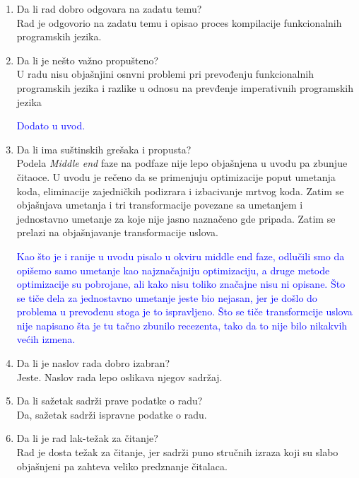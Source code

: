 \documentclass[a4paper]{report}
\newcommand{\odgovor}[1]{\textcolor{blue}{#1}}
\begin{document}
	\begin{enumerate}
		
		\item Da li rad dobro odgovara na zadatu temu?\\
		Rad je odgovorio na zadatu temu i opisao proces kompilacije funkcionalnih programskih jezika.
		
		\item Da li je nešto važno propušteno?\\
		U radu nisu objašnjini osnvni problemi pri prevođenju funkcionalnih programskih jezika i razlike u odnosu na prevđenje imperativnih programskih jezika
		
		\odgovor{Dodato u uvod.}
		
		\item Da li ima suštinskih grešaka i propusta?\\
		Podela \emph{Middle end} faze na podfaze nije lepo objašnjena u uvodu pa zbunjue čitaoce. U uvodu je rečeno da se primenjuju  optimizacije poput umetanja koda, eliminacije zajedničkih podizrara i izbacivanje mrtvog koda. Zatim se objašnjava umetanja i tri transformacije povezane sa umetanjem i jednostavno umetanje za koje nije jasno naznačeno gde pripada. Zatim se prelazi na objašnjavanje transformacije uslova.
		
		\odgovor{Kao što je i ranije u uvodu pisalo u okviru middle end faze, odlučili smo da opišemo samo umetanje kao najznačajniju optimizaciju, a druge metode optimizacije su pobrojane, ali kako nisu toliko značajne nisu ni opisane. Što se tiče dela za jednostavno umetanje jeste bio nejasan, jer je došlo do problema u prevođenu stoga je to ispravljeno. Što se tiče transformcije uslova nije napisano šta je tu tačno zbunilo recezenta, tako da to nije bilo nikakvih većih izmena.}
		
		\item Da li je naslov rada dobro izabran?\\
		Jeste. Naslov rada lepo oslikava njegov sadržaj.
		
		\item Da li sažetak sadrži prave podatke o radu?\\
		Da, sažetak sadrži ispravne podatke o radu.
		
		\item Da li je rad lak-težak za čitanje?\\
		Rad je dosta težak za čitanje, jer sadrži puno stručnih izraza koji su slabo objašnjeni pa zahteva veliko predznanje čitalaca. 
		

\end{enumerate}
\end{document}
